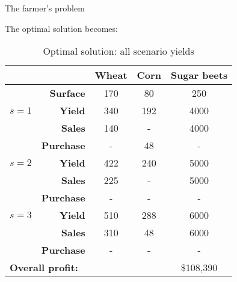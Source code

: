 \begin{frame}{The farmer's problem {\small \cite{birge2011introduction}}}

	The optimal solution becomes:
	
	{\small 
	\begin{table}
		\begin{tabular}{lrccc}
		   		 &	        & \bf Wheat & \bf Corn & \bf Sugar beets \\ \hline
		   		 & \bf Surface  & 170	& 80   & 250     	 \\ \hline
		   $s=1$ & \bf Yield	& 340   & 192  & 4000     \\
			   	 & \bf Sales    & 140   & -    & 4000     \\  
			     & \bf Purchase & -     & 48    & -        \\ \hline
		   $s=2$ & \bf Yield	& 422   & 240  & 5000     \\
			   	 & \bf Sales    & 225   & -    & 5000     \\  
			     & \bf Purchase & -     & -    & -        \\ \hline
		   $s=3$ & \bf Yield	& 510   & 288  & 6000     \\
			   	 & \bf Sales    & 310   & 48   & 6000     \\  
			     & \bf Purchase & -     & -    & -        \\ \hline
			\multicolumn{4}{l}{\bf Overall profit:} & \$108,390  \\ \hline 
		\end{tabular}
		\caption{Optimal solution: all scenario yields}
	\end{table}
	}
	
\end{frame}


